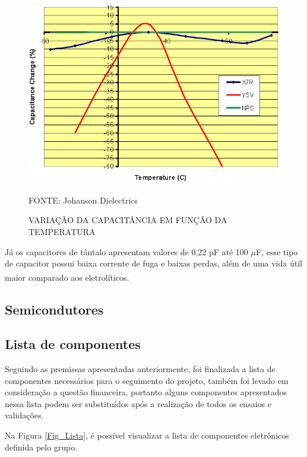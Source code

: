 \documentclass[
	12pt,				%
	openright,			%
	oneside,			%
	a4paper,			%
	english,			%
	french,				%
	spanish,			%
	brazil,				%
	oldfontcommands
	]{abntex2}
\begin{document}
	\begin{figure}[th]
		\caption{VARIAÇÃO DA CAPACITÂNCIA EM FUNÇÃO DA TEMPERATURA}
		\label{Fig_Cap_Temp}
		\centering
		\includegraphics[width=1.0\linewidth]{./figs/y5v}
			
		\begin{small}
			FONTE: Johanson Dielectrics\textsuperscript{\cite{y5v}}
		\end{small}		
	\end{figure}
	\pagebreak

	Já os capacitores de tântalo apresentam valores de 0,22 pF até 100 $\mu$F, esse tipo de capacitor possui baixa corrente de fuga e baixas perdas, além de uma vida útil maior comparado aos eletrolíticos.\textsuperscript{\cite{x7r}}

\subsection[Semicondutores]{Semicondutores}

\subsection[Lista de componentes]{Lista de componentes}

	Seguindo as premissas apresentadas anteriormente, foi finalizada a lista de componentes necessários para o seguimento do projeto, também foi levado em consideração a questão financeira, portanto alguns componentes apresentados nessa lista podem ser substituídos após a realização de todos os ensaios e validações.
	
	Na Figura \ref{Fig_Lista}, é possível visualizar a lista de componentes eletrônicos definida pelo grupo.
	
\end{document}
